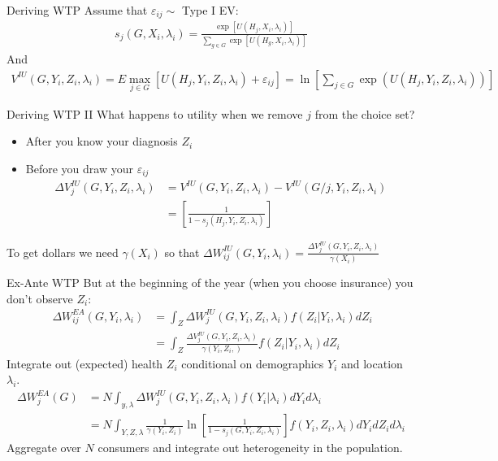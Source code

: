 \begin{frame}{Deriving WTP}
Assume that $\varepsilon_{ij} \sim$ Type I EV:
\begin{align*}
s_{j}\left(G, X_{i}, \lambda_{i}\right)=\frac{\exp \left[U\left(H_{j}, X_{i}, \lambda_{i}\right)\right]}{\sum_{g \in G} \exp \left[U\left(H_{g}, X_{i}, \lambda_{i}\right)\right]}
\end{align*}
And
\begin{align*}
V^{I U}\left(G, Y_{i}, Z_{i}, \lambda_{i}\right)=E \max _{j \in G}\left[U\left(H_{j}, Y_{i}, Z_{i}, \lambda_{i}\right)+\varepsilon_{i j}\right]=\ln \left[\sum_{j \in G} \exp \left(U\left(H_{j}, Y_{i}, Z_{i}, \lambda_{i}\right)\right)\right]
\end{align*}
\end{frame}

\begin{frame}{Deriving WTP II}
What happens to utility when we remove $j$ from the choice set?
\begin{itemize}
\item \alert{After} you know your diagnosis $Z_i$
\item \alert{Before} you draw your $\varepsilon_{ij}$
\begin{align*}\Delta V_{j}^{I U}\left(G, Y_{i}, Z_{i}, \lambda_{i}\right)  &=V^{I U}\left(G, Y_{i}, Z_{i}, \lambda_{i}\right)-V^{I U}\left(G / j, Y_{i}, Z_{i}, \lambda_{i}\right) \\
&=\left[\frac{1}{1-s_{j}\left(H_{j}, Y_{i}, Z_{i}, \lambda_{i}\right)}\right]
\end{align*}
\end{itemize}
To get dollars we need $\gamma(X_i)$ so that $\Delta W_{ij}^{IU}(G,Y_i,\lambda_i) = \frac{\Delta V_{j}^{I U}\left(G, Y_{i}, Z_{i}, \lambda_{i}\right) }{\gamma(X_i)}$
\end{frame}

\begin{frame}{Ex-Ante WTP}
But at the beginning of the year (when you choose insurance) you don't observe $Z_i$:
\begin{align*}
\ \Delta W_{i j}^{E A}\left(G, Y_{i}, \lambda_{i}\right) &=\int_{Z} \Delta W_{j}^{I U}\left(G, Y_{i}, Z_{i}, \lambda_{i}\right) f\left(Z_{i} | Y_{i}, \lambda_{i}\right) d Z_{i} \\
 &=\int_{Z} \frac{\Delta V_{j}^{I U}\left(G, Y_{i}, Z_{i}, \lambda_{i}\right)}{\gamma\left(Y_{i}, Z_{i},\right)} f\left(Z_{i} | Y_{i}, \lambda_{i}\right) d Z_{i} 
 \end{align*}
 Integrate out (expected) health $Z_i$ conditional on demographics $Y_i$ and location $\lambda_i$.
\begin{align*}
 \Delta W_{j}^{E A}(G) &=N \int_{y, \lambda} \Delta W_{j}^{I U}\left(G, Y_{i}, Z_{i}, \lambda_{i}\right) f\left(Y_{i} | \lambda_{i}\right) d Y_{i} d \lambda_{i} \\ &=N \int_{Y, Z, \lambda} \frac{1}{\gamma\left(Y_{i}, Z_{i}\right)} \ln \left[\frac{1}{1-s_{j}\left(G, Y_{i}, Z_{i}, \lambda_{i}\right)}\right] f\left(Y_{i}, Z_{i}, \lambda_{i}\right) d Y_{i} d Z_{i} d \lambda_{i}
\end{align*}
Aggregate over $N$ consumers and integrate out heterogeneity in the population.
\end{frame}


